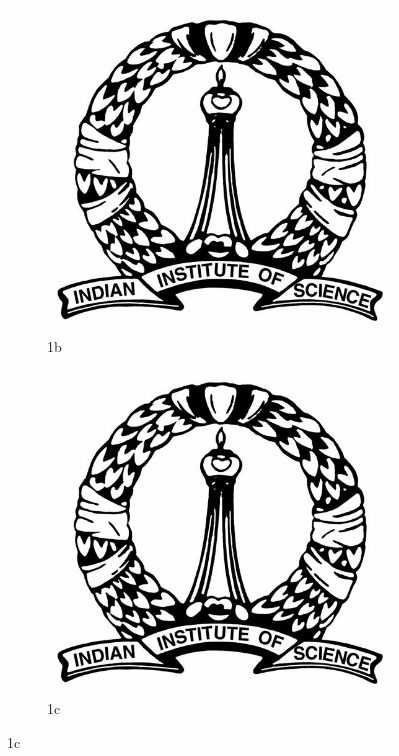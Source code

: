 \documentclass[10pt,a4paper]{article}
\begin{document}
\begin{figure}
\begin{subfigure}{.30\textwidth}
\centering
\includegraphics[width=1.0\linewidth]{IISc_logo.jpg}
\caption{1b}
\label{fig:sfig2}
\end{subfigure}
%
\begin{subfigure}{.30\textwidth}
\centering
\includegraphics[width=1.0\linewidth]{IISc_logo.jpg}
\caption{1c}
\label{fig:sfig3}
\end{subfigure}


\end{figure}
\end{document}
